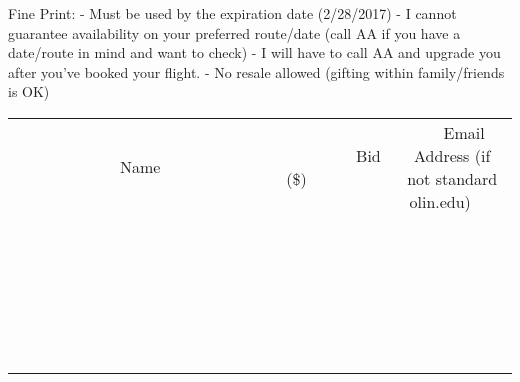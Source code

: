 \documentclass[11pt]{article}
\begin{document}
Fine Print: 
  - Must be used by the expiration date (2/28/2017)
  - I cannot guarantee availability on your preferred route/date (call AA if you have a date/route in mind and want to check)
  - I will have to call AA and upgrade you after you've booked your flight.
  - No resale allowed (gifting within family/friends is OK)
\\[6ex]
\begin{tabular}{c c c}
~~~~~~~~~~~~~Name~~~~~~~~~~~~~ & ~~~~~~~~~Bid (\$)~~~~~~~~~  & ~~~Email Address (if not standard olin.edu)~~~\\
 & & \\
\hline
 & & \\
\hline
 & & \\
\hline
 & & \\
\hline
 & & \\
\hline
 & & \\
\hline
 & & \\
\hline
 & & \\
\hline
 & & \\
\hline
 & & \\
\hline
 & & \\
\hline
 & & \\
\hline
 & & \\
\hline
 & & \\
\hline
 & & \\
\hline
 & & \\
\hline
 & & \\
\hline
 & & \\
\hline
 & & \\
\hline
 & & \\
\hline
 & & \\
\hline
 & & \\
\hline
 & & \\
\hline
 & & \\
\hline
 & & \\
\hline
 & & \\
\hline
\end{tabular}
\newpage
\end{document}
